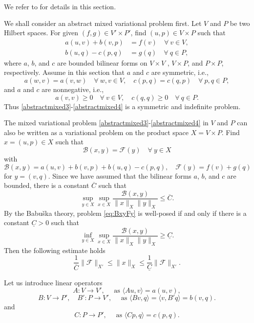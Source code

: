 We refer to \cite{Zulehner2011} for details in this section.

We shall consider an abstract mixed variational
problem first. Let $V$ and $P$ be two Hilbert spaces. For given $(f, g)\in V'\times P'$, find
$(u, p)\in V \times P$ such that
\begin{align}
a(u, v)+ b(v, p) & =f(v) \quad \forall~v\in V, \label{abstractmixed3}\\
b(u, q)-c(p,q) & =g(q)  \quad \forall~q\in P,\label{abstractmixed4}
\end{align}
where $a$, $b$, and $c$ are bounded bilinear forms on $V\times V$ , $V\times P$, and $P\times P$, respectively.
Assume in this section that $a$ and $c$ are symmetric, i.e.,
\[
a(w,v)=a(v,w)\quad\forall~w,v\in V,\quad c(p,q)=c(q,p)\quad\forall~p,q\in P,
\]
and $a$ and $c$ are nonnegative, i.e.,
\[
a(v,v)\geq0\quad\forall~v\in V, \quad c(q,q)\geq0\quad\forall~q\in P.
\]
Thus \eqref{abstractmixed3}-\eqref{abstractmixed4} is a symmetric and indefinite problem.

The mixed variational problem \eqref{abstractmixed3}-\eqref{abstractmixed4} in $V$ and $P$ can also be written as a variational problem on the product space $X=V\times P$. Find $x=(u,p)\in X$ such that
\begin{equation}\label{eq:BxyFy}
\mathcal B(x, y) =\mathcal F(y) \quad\forall~y\in X
\end{equation}
with
\[
\mathcal B(x, y)=a(u,v)+b(v,p)+b(u,q)-c(p,q) ,\quad\mathcal F(y)=f(v)+g(q)
\]
for $y=(v,q)$.
Since we have assumed that the bilinear forms $a$, $b$, and $c$ are bounded, there is a
constant $\overline{C}$ such that
\begin{equation}\label{eq:Bsupsup}
\sup_{y\in X}\sup_{x\in X}\frac{\mathcal B(x, y)}{\|x\|_X\|y\|_X}\leq \overline{C}.
\end{equation}
By the Babu\v{s}ka theory, problem \eqref{eq:BxyFy} is well-posed if and only if there is a constant $\underline{C}>0$ such that
\begin{equation}\label{eq:Binfsup}
\inf_{y\in X}\sup_{x\in X}\frac{\mathcal B(x, y)}{\|x\|_X\|y\|_X}\geq \underline{C}.
\end{equation}
Then the following estimate holds
\[
\frac{1}{\overline{C}}\|\mathcal F\|_{X'}\leq \|x\|_X\leq \frac{1}{\underline{C}}\|\mathcal F\|_{X'}.
\]

Let us introduce linear operators
\[
A : V \to V',\quad \textrm{ as } \langle Au, v\rangle = a(u, v),
\]
\[
B: V\to P', \quad B' : P \to V',\quad \textrm{ as } \langle Bv, q\rangle = \langle v, B'q\rangle = b(v, q).
\]
and
\[
C : P \to P',\quad \textrm{ as } \langle Cp, q\rangle = c(p, q).
\]

